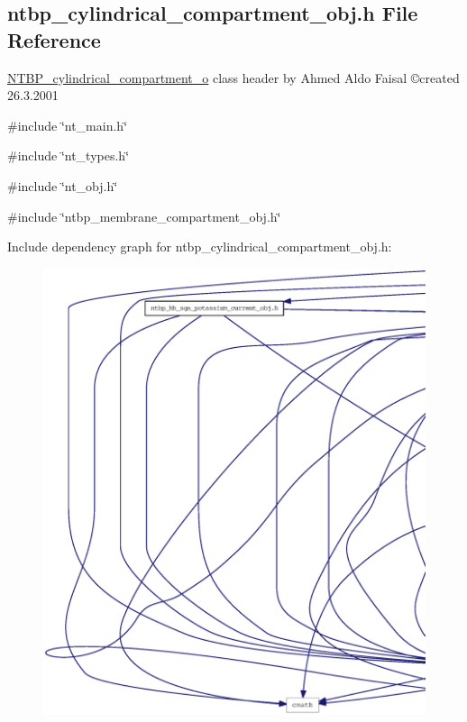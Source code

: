 \subsection{ntbp\_\-cylindrical\_\-compartment\_\-obj.h File Reference}
\label{ntbp__cylindrical__compartment__obj_8h}



\begin{DoxyItemize}
\item \hyperlink{class_n_t_b_p__cylindrical__compartment__o}{NTBP\_\-cylindrical\_\-compartment\_\-o} class header by Ahmed Aldo Faisal \copyright created 26.3.2001 
\end{DoxyItemize} 


{\ttfamily \#include \char`\"{}nt\_\-main.h\char`\"{}}\par
{\ttfamily \#include \char`\"{}nt\_\-types.h\char`\"{}}\par
{\ttfamily \#include \char`\"{}nt\_\-obj.h\char`\"{}}\par
{\ttfamily \#include \char`\"{}ntbp\_\-membrane\_\-compartment\_\-obj.h\char`\"{}}\par
Include dependency graph for ntbp\_\-cylindrical\_\-compartment\_\-obj.h:
\nopagebreak
\begin{figure}[H]
\begin{center}
\leavevmode
\includegraphics[width=400pt]{ntbp__cylindrical__compartment__obj_8h__incl}
\end{center}
\end{figure}
